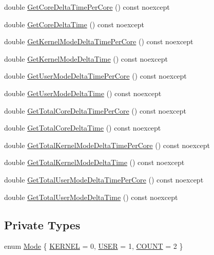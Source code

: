 \begin{DoxyCompactItemize}
double \hyperlink{classmage_1_1_c_p_u_timer_a34a75e0198d62dc54fa3a8b179e7dd58}{Get\+Core\+Delta\+Time\+Per\+Core} () const noexcept
\item 
double \hyperlink{classmage_1_1_c_p_u_timer_a5aa4ed4a79c443c67106d3e994234b04}{Get\+Core\+Delta\+Time} () const noexcept
\item 
double \hyperlink{classmage_1_1_c_p_u_timer_afe75c00692363c1a942c50d84a348b56}{Get\+Kernel\+Mode\+Delta\+Time\+Per\+Core} () const noexcept
\item 
double \hyperlink{classmage_1_1_c_p_u_timer_af2df68d4661e7275d15b8c548ed62fbb}{Get\+Kernel\+Mode\+Delta\+Time} () const noexcept
\item 
double \hyperlink{classmage_1_1_c_p_u_timer_a3ce491aca668067476465b4ab56f4809}{Get\+User\+Mode\+Delta\+Time\+Per\+Core} () const noexcept
\item 
double \hyperlink{classmage_1_1_c_p_u_timer_a3f48c03a091bacb29fd635a6b27f5dec}{Get\+User\+Mode\+Delta\+Time} () const noexcept
\item 
double \hyperlink{classmage_1_1_c_p_u_timer_a283ab5a88d415390cc8c4e9139492a20}{Get\+Total\+Core\+Delta\+Time\+Per\+Core} () const noexcept
\item 
double \hyperlink{classmage_1_1_c_p_u_timer_a16e1bccdbc31f9345b52ffd9931fdcbd}{Get\+Total\+Core\+Delta\+Time} () const noexcept
\item 
double \hyperlink{classmage_1_1_c_p_u_timer_a77ec8684798ab24663645e0f442d1a27}{Get\+Total\+Kernel\+Mode\+Delta\+Time\+Per\+Core} () const noexcept
\item 
double \hyperlink{classmage_1_1_c_p_u_timer_a0642a593102eaf9aebdca5ef311f6476}{Get\+Total\+Kernel\+Mode\+Delta\+Time} () const noexcept
\item 
double \hyperlink{classmage_1_1_c_p_u_timer_a8bacfdc05ffbdbb1b8277c31db0b5e59}{Get\+Total\+User\+Mode\+Delta\+Time\+Per\+Core} () const noexcept
\item 
double \hyperlink{classmage_1_1_c_p_u_timer_a47b97434d94a954786315d11f8af7983}{Get\+Total\+User\+Mode\+Delta\+Time} () const noexcept
\end{DoxyCompactItemize}
\subsection*{Private Types}
\begin{DoxyCompactItemize}
\item 
enum \hyperlink{classmage_1_1_c_p_u_timer_a95a81bb0f32d2cc9881f311a0f6fa895}{Mode} \{ \hyperlink{classmage_1_1_c_p_u_timer_a95a81bb0f32d2cc9881f311a0f6fa895ace8cda0f285b09fb6a66754abf634bd5}{K\+E\+R\+N\+EL} = 0, 
\hyperlink{classmage_1_1_c_p_u_timer_a95a81bb0f32d2cc9881f311a0f6fa895a299d45b380f8d5893624832a2ac32157}{U\+S\+ER} = 1, 
\hyperlink{classmage_1_1_c_p_u_timer_a95a81bb0f32d2cc9881f311a0f6fa895a780a9a1245e4e551833ba02eb606bdf8}{C\+O\+U\+NT} = 2
 \}
\end{DoxyCompactItemize}
